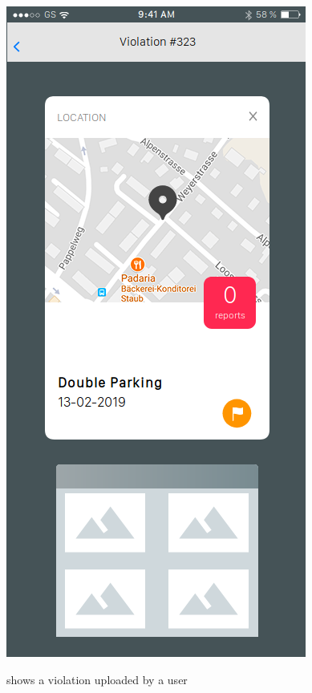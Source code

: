 \documentclass[../RASD.tex]{subfiles}
\begin{document}
    \begin{figure}[H]
        \centering
        \includegraphics[scale = 0.4]{assets/viewreport.png}\\[1.6 cm]
        \caption[View Report \textit{Mockup}]{shows a violation uploaded by a user}
    \end{figure}
\end{document}
